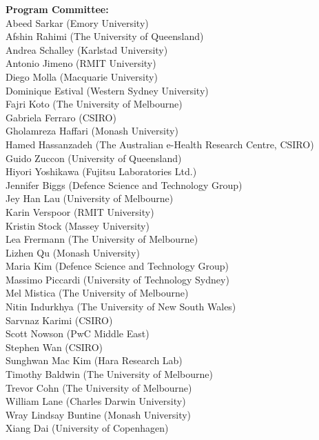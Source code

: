 \documentclass[a4paper,11pt,oneside]{book}
\begin{document}
\begin{description}
\vspace{1mm}
\item{\bf Program Committee:}\vspace{2mm} \\
Abeed Sarkar (Emory University)\\
Afshin Rahimi (The University of Queensland)\\
Andrea Schalley (Karlstad University)\\
Antonio Jimeno (RMIT University)\\
Diego Molla (Macquarie University)\\
Dominique Estival (Western Sydney University)\\
Fajri Koto (The University of Melbourne)\\
Gabriela Ferraro (CSIRO)\\
Gholamreza Haffari (Monash University)\\
Hamed Hassanzadeh (The Australian e-Health Research Centre, CSIRO)\\
Guido Zuccon (University of Queensland)\\
Hiyori Yoshikawa (Fujitsu Laboratories Ltd.)\\
Jennifer Biggs (Defence Science and Technology Group)\\
Jey Han Lau (University of Melbourne)\\
Karin Verspoor (RMIT University)\\
Kristin Stock (Massey University)\\
Lea Frermann (The University of Melbourne)\\
Lizhen Qu (Monash University)\\
Maria Kim (Defence Science and Technology Group)\\
Massimo Piccardi (University of Technology Sydney)\\
Mel Mistica (The University of Melbourne)\\
Nitin Indurkhya (The University of New South Wales)\\
Sarvnaz Karimi (CSIRO)\\
Scott Nowson (PwC Middle East)\\
Stephen Wan (CSIRO)\\
Sunghwan Mac Kim (Hara Research Lab)\\
Timothy Baldwin (The University of Melbourne)\\
Trevor Cohn (The University of Melbourne)\\
William Lane (Charles Darwin University)\\
Wray Lindsay Buntine (Monash University)\\
Xiang Dai (University of Copenhagen)


\end{description}
\end{document}
